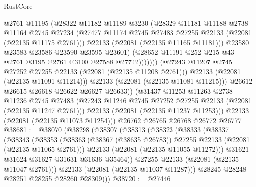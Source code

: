\begin{lexlean}{RustCore}
\begin{coremodule}
                          @2761
                          @11195
                          (@28322
                            @11182
                            @11189
                            @3230
                            (@28329
                              @11181
                              @11188
                              @2738
                              @11164
                              @2745
                              @27234
                              (@27477
                                @11174
                                @2745
                                @27483
                                @27255
                                @22133
                                (@22081 (@22135 @11175 @2761)))
                              @22133
                              (@22081 (@22135 @11165 @11181)))
                            @23580
                            @23583
                            @23586
                            @23590
                            @23595
                            @23601)
                          (@28652 @11191 @252 @215 @43 @2761 @3195 @2761 @3100 @27588 @27742)))))))
              (@27243 @11207 @2745 @27252 @27255 @22133 (@22081 (@22135 @11208 @2761)))
              @22133
              (@22081 (@22135 @11091 @11214)))
            @22133
            (@22081 (@22135 @11081 @11215)))
          @26612
          @26615
          @26618
          @26622
          @26627
          @26633))
      (@31437
        @11253
        @11263
        @2738
        @11236
        @2745
        @27483
        (@27243 @11246 @2745 @27252 @27255 @22133 (@22081 (@22135 @11247 @2761)))
        @22133
        (@22081 (@22135 @11237 @11253)))
      @22133
      (@22081 (@22135 @11073 @11254)))
    @26762
    @26765
    @26768
    @26772
    @26777
@38681 := @38070
    (@38298
      (@38307
        (@38313
          (@38323
            (@38333
              (@38337
                (@38343
                  (@38353
                    (@38363 (@38367 (@38635 @26783)) @27255 @22133 (@22081 (@22135 @11065 @2761)))
                    @22133
                    (@22081 (@22135 @11055 @11272)))
                  @31621
                  @31624
                  @31627
                  @31631
                  @31636
                  @35464))
              @27255
              @22133
              (@22081 (@22135 @11047 @2761)))
            @22133
            (@22081 (@22135 @11037 @11287)))
          @28245
          @28248
          @28251
          @28255
          @28260
          @28309)))
@38720 := @27446

\end{coremodule}
\end{lexlean}

